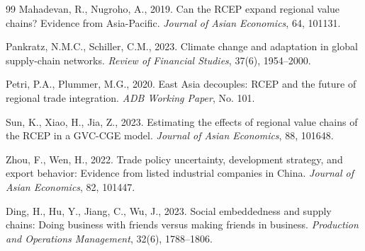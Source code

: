 \documentclass[preprint,12pt,authoryear]{elsarticle}
\begin{document}
\begin{thebibliography}{99}
Mahadevan, R., Nugroho, A., 2019.
\newblock Can the RCEP expand regional value chains? Evidence from Asia-Pacific.
\newblock \textit{Journal of Asian Economics}, 64, 101131.

Pankratz, N.M.C., Schiller, C.M., 2023.
\newblock Climate change and adaptation in global supply-chain networks.
\newblock \textit{Review of Financial Studies}, 37(6), 1954--2000.

Petri, P.A., Plummer, M.G., 2020.
\newblock East Asia decouples: RCEP and the future of regional trade integration.
\newblock \textit{ADB Working Paper}, No. 101.

Sun, K., Xiao, H., Jia, Z., 2023.
\newblock Estimating the effects of regional value chains of the RCEP in a GVC-CGE model.
\newblock \textit{Journal of Asian Economics}, 88, 101648.

Zhou, F., Wen, H., 2022.
\newblock Trade policy uncertainty, development strategy, and export behavior: Evidence from listed industrial companies in China.
\newblock \textit{Journal of Asian Economics}, 82, 101447.

Ding, H., Hu, Y., Jiang, C., Wu, J., 2023.
\newblock Social embeddedness and supply chains: Doing business with friends versus making friends in business.
\newblock \textit{Production and Operations Management}, 32(6), 1788--1806.

\end{thebibliography}
\end{document}
